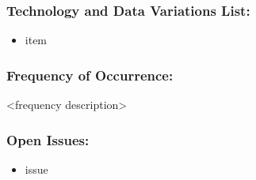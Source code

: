 \documentclass[ProductRequirements.tex]{subfiles}
\begin{document}
	\subsubsection{Technology and Data Variations List:}
	\begin{itemize}\itemsep1pt
		\item item
	\end{itemize}
	\subsubsection{Frequency of Occurrence:}
	<frequency description>
	\subsubsection{Open Issues:}
	\begin{itemize}\itemsep1pt
		\item issue
	\end{itemize}		
		
\end{document}
